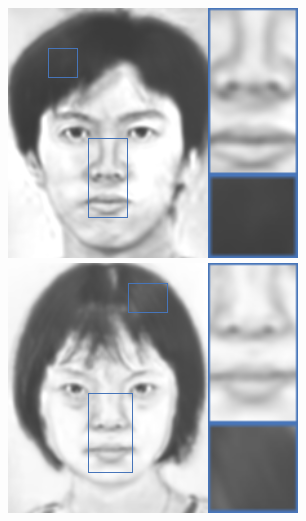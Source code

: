 \documentclass[10pt,twocolumn,letterpaper]{article}
\begin{document}
\begin{figure}[htbp]
{\begin{minipage}[b]{0.13\linewidth}
\includegraphics[width=0.99\linewidth]{img/sketch_result/fcnn_s1.png}
\includegraphics[width=0.99\linewidth]{img/sketch_result/fcnn_s2.png}

\end{minipage}}
\end{figure}
\end{document}
